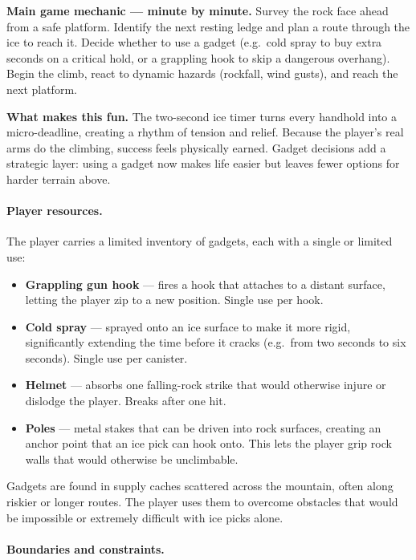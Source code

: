 \documentclass[12pt]{article}
\begin{document}
\textbf{Main game mechanic --- minute by minute.} Survey the rock face ahead from a safe platform. Identify the next resting ledge and plan a route through the ice to reach it. Decide whether to use a gadget (e.g.\ cold spray to buy extra seconds on a critical hold, or a grappling hook to skip a dangerous overhang). Begin the climb, react to dynamic hazards (rockfall, wind gusts), and reach the next platform.

\textbf{What makes this fun.} The two-second ice timer turns every handhold into a micro-deadline, creating a rhythm of tension and relief. Because the player's real arms do the climbing, success feels physically earned. Gadget decisions add a strategic layer: using a gadget now makes life easier but leaves fewer options for harder terrain above.

\paragraph{Player resources.}

The player carries a limited inventory of gadgets, each with a single or limited use:

\begin{itemize}[leftmargin=2em]
    \item \textbf{Grappling gun hook} --- fires a hook that attaches to a distant surface, letting the player zip to a new position. Single use per hook.
    \item \textbf{Cold spray} --- sprayed onto an ice surface to make it more rigid, significantly extending the time before it cracks (e.g.\ from two seconds to six seconds). Single use per canister.
    \item \textbf{Helmet} --- absorbs one falling-rock strike that would otherwise injure or dislodge the player. Breaks after one hit.
    \item \textbf{Poles} --- metal stakes that can be driven into rock surfaces, creating an anchor point that an ice pick can hook onto. This lets the player grip rock walls that would otherwise be unclimbable.
\end{itemize}

Gadgets are found in supply caches scattered across the mountain, often along riskier or longer routes. The player uses them to overcome obstacles that would be impossible or extremely difficult with ice picks alone.

\paragraph{Boundaries and constraints.}
\end{document}
